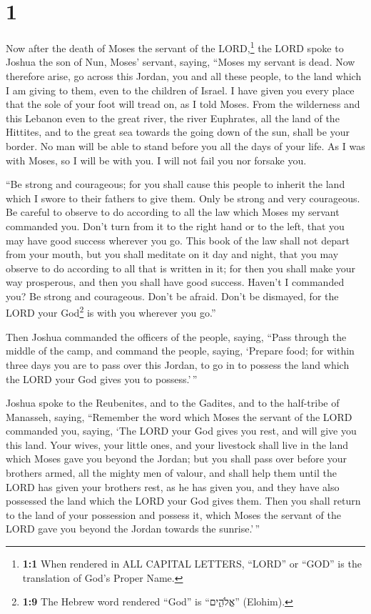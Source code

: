\hypertarget{section}{%
\section{1}\label{section}}

 Now after the death of Moses the servant of the
LORD,\footnote{\textbf{1:1} When rendered in ALL CAPITAL LETTERS,
  ``LORD'' or ``GOD'' is the translation of God's Proper Name.} the LORD
spoke to Joshua the son of Nun, Moses' servant, saying, 
``Moses my servant is dead. Now therefore arise, go across this Jordan,
you and all these people, to the land which I am giving to them, even to
the children of Israel.  I have given you every place that
the sole of your foot will tread on, as I told Moses. 
From the wilderness and this Lebanon even to the great river, the river
Euphrates, all the land of the Hittites, and to the great sea towards
the going down of the sun, shall be your border.  No man
will be able to stand before you all the days of your life. As I was
with Moses, so I will be with you. I will not fail you nor forsake you.

 ``Be strong and courageous; for you shall cause this
people to inherit the land which I swore to their fathers to give them.
 Only be strong and very courageous. Be careful to observe
to do according to all the law which Moses my servant commanded you.
Don't turn from it to the right hand or to the left, that you may have
good success wherever you go.  This book of the law shall
not depart from your mouth, but you shall meditate on it day and night,
that you may observe to do according to all that is written in it; for
then you shall make your way prosperous, and then you shall have good
success.  Haven't I commanded you? Be strong and
courageous. Don't be afraid. Don't be dismayed, for the LORD your
God\footnote{\textbf{1:9} The Hebrew word rendered ``God'' is
  ``אֱלֹהִ֑ים'' (Elohim).} is with you wherever you go.''

 Then Joshua commanded the officers of the people,
saying,  ``Pass through the middle of the camp, and
command the people, saying, `Prepare food; for within three days you are
to pass over this Jordan, to go in to possess the land which the LORD
your God gives you to possess.'\,''

 Joshua spoke to the Reubenites, and to the Gadites, and
to the half-tribe of Manasseh, saying,  ``Remember the
word which Moses the servant of the LORD commanded you, saying, `The
LORD your God gives you rest, and will give you this land.
 Your wives, your little ones, and your livestock shall
live in the land which Moses gave you beyond the Jordan; but you shall
pass over before your brothers armed, all the mighty men of valour, and
shall help them  until the LORD has given your brothers
rest, as he has given you, and they have also possessed the land which
the LORD your God gives them. Then you shall return to the land of your
possession and possess it, which Moses the servant of the LORD gave you
beyond the Jordan towards the sunrise.'\,''

